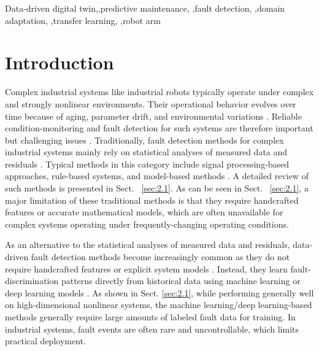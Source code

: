 \documentclass[a4paper,10pt]{cas-sc}%
\begin{document}
\begin{keywords}
	Data-driven digital twin,\sep predictive maintenance, \sep fault detection, \sep domain adaptation, \sep transfer learning, \sep robot arm
\end{keywords}

\maketitle

%
%
\section{Introduction}

Complex industrial systems like industrial robots typically operate under complex and strongly nonlinear environments. Their operational behavior evolves over time because of aging, parameter drift, and environmental variations \citep{QIAO201851, lei2025condition}. Reliable condition-monitoring and fault detection for such systems are therefore important but challenging issues \citep{SABRY2024102397}. Traditionally, fault detection methods for complex industrial systems mainly rely on statistical analyses of measured data and residuals \citep{SABRY2024102397}. Typical methods in this category include signal processing-based approaches, rule-based systems, and model-based methods \citep{SABRY2024102397, 9529495}. A detailed review of such methods is presented in Sect. ~\ref{sec:2.1}. As can be seen in Sect. ~\ref{sec:2.1}, a major limitation of these traditional methods is that they require handcrafted features or accurate mathematical models, which are often unavailable for complex systems operating under frequently-changing operating conditions.

As an alternative to the statistical analyses of measured data and residuals, data-driven fault detection methods become increasingly common as they do not require handcrafted features or explicit system models \citep{SABRY2024102397, 9529495}. Instead, they learn fault-discrimination patterns directly from historical data using machine learning or deep learning models \citep{SABRY2024102397, 9529495}. As shown in Sect. \ref{sec:2.1}, while performing generally well on high-dimensional nonlinear systems, the machine learning/deep learning-based methods generally require large amounts of labeled fault data for training. In industrial systems, fault events are often rare and uncontrollable, which limits practical deployment.
\end{document}
